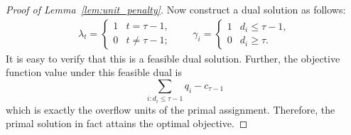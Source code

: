 \begin{proof}[Proof of Lemma~\ref{lem:unit_penalty}]
Now construct a dual solution as follows:
\begin{align*}
\lambda_t = \begin{cases}
1 & t = \tau-1, \\
0 & t \neq \tau-1;
\end{cases} 
\qquad 
\gamma_i = \begin{cases}
1 & d_{i} \leq \tau-1 , \\
0 & d_{i} \geq \tau.
\end{cases}
\end{align*}
It is easy to verify that this is a feasible dual solution. Further, the objective function value under this feasible dual is
\[ \sum_{ i : d_{i} \leq \tau -1} q_i  - c_{\tau-1} \]
which is exactly the overflow units of the primal assignment. Therefore, the primal solution in fact attains the optimal objective. 
\end{proof}










